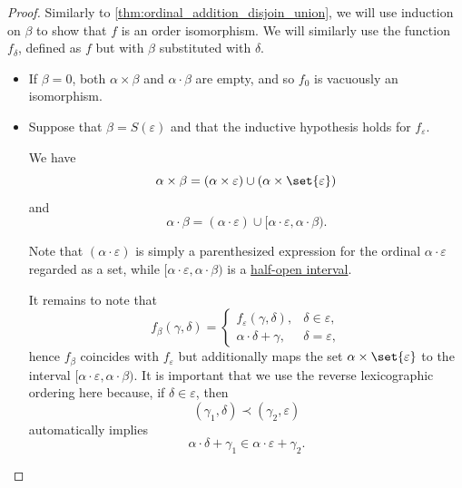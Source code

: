 \begin{proof}
  Similarly to \cref{thm:ordinal_addition_disjoin_union}, we will use induction on \( \beta \) to show that \( f \) is an order isomorphism. We will similarly use the function \( f_\delta \), defined as \( f \) but with \( \beta \) substituted with \( \delta \).

  \begin{itemize}
    \item If \( \beta = 0 \), both \( \alpha \times \beta \) and \( \alpha \cdot \beta \) are empty, and so \( f_0 \) is vacuously an isomorphism.

    \item Suppose that \( \beta = S(\varepsilon) \) and that the inductive hypothesis holds for \( f_\varepsilon \).

    We have
    \begin{equation*}
      \alpha \times \beta = (\alpha \times \varepsilon) \cup (\alpha \times \set{ \varepsilon })
    \end{equation*}
    and
    \begin{equation*}
      \alpha \cdot \beta = (\alpha \cdot \varepsilon) \cup [\alpha \cdot \varepsilon, \alpha \cdot \beta).
    \end{equation*}

    Note that \( (\alpha \cdot \varepsilon) \) is simply a parenthesized expression for the ordinal \( \alpha \cdot \varepsilon \) regarded as a set, while \( [\alpha \cdot \varepsilon, \alpha \cdot \beta) \) is a \hyperref[def:order_interval/half_open]{half-open interval}.

    It remains to note that
    \begin{equation*}
      f_\beta(\gamma, \delta) = \begin{cases}
        f_\varepsilon(\gamma, \delta), &\delta \in \varepsilon, \\
        \alpha \cdot \delta + \gamma,  &\delta = \varepsilon,
      \end{cases}
    \end{equation*}
    hence \( f_\beta \) coincides with \( f_\varepsilon \) but additionally maps the set \( \alpha \times \set{ \varepsilon } \) to the interval \( [\alpha \cdot \varepsilon, \alpha \cdot \beta) \). It is important that we use the reverse lexicographic ordering here because, if \( \delta \in \varepsilon \), then
    \begin{equation*}
      (\gamma_1, \delta) \prec (\gamma_2, \varepsilon)
    \end{equation*}
    automatically implies
    \begin{equation*}
      \alpha \cdot \delta + \gamma_1 \in \alpha \cdot \varepsilon + \gamma_2.
    \end{equation*}


\end{itemize}
\end{proof}
